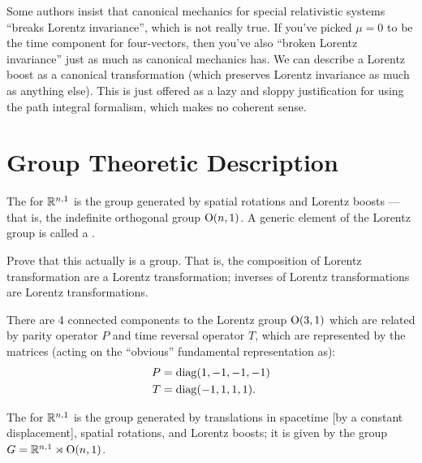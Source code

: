 \begin{ddanger}
Some authors insist that canonical mechanics for special relativistic
systems ``breaks Lorentz invariance'', which is not really true. If
you've picked $\mu=0$ to be the time component for four-vectors, then
you've also ``broken Lorentz invariance'' just as much as canonical
mechanics has. We can describe a Lorentz boost as a canonical
transformation (which preserves Lorentz invariance as much as anything
else). This is just offered as a lazy and sloppy justification for using
the path integral formalism, which makes no coherent sense.
\end{ddanger}

\section{Group Theoretic Description}

\begin{definition}
The  for $\mathbb{R}^{n,1}$ is the group
generated by spatial rotations and Lorentz boosts --- that is, the indefinite
orthogonal group $\mathrm{O}(n,1)$. A generic element of the Lorentz group is
called a .
\end{definition}

\begin{exercise}
Prove that this actually is a group. That is, the composition of Lorentz
transformation are a Lorentz transformation; inverses of Lorentz
transformations are Lorentz transformations.
\end{exercise}

\M
There are 4 connected components to the Lorentz group $\mathrm{O}(3,1)$ which
are related by parity operator $P$ and time reversal operator $T$, which
are represented by the matrices (acting on the ``obvious'' fundamental
representation as):
\begin{subequations}
\begin{align}
P &= \operatorname{diag}(1, -1, -1, -1)\\
T &= \operatorname{diag}(-1, 1, 1, 1).
\end{align}
\end{subequations}

\begin{definition}
The  for $\mathbb{R}^{n,1}$ is the group generated by
translations in spacetime [by a constant displacement], spatial
rotations, and Lorentz boosts; it is given by the group
$G = \mathbb{R}^{n,1}\rtimes\mathrm{O}(n,1)$.
\end{definition}

